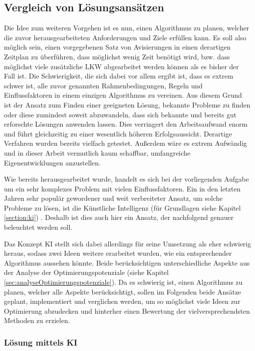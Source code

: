 \subsection{Vergleich von Lösungsansätzen}

Die Idee zum weiteren Vorgehen ist es nun, einen Algorithmus zu planen, welcher die zuvor herausgearbeiteten Anforderungen und Ziele erfüllen kann. Es soll also möglich sein, einen vorgegebenen Satz von Avisierungen in einen derartigen Zeitplan zu überführen, dass möglichst wenig Zeit benötigt wird, bzw. dass möglichst viele zusätzliche LKW abgearbeitet werden können als es bisher der Fall ist. Die Schwierigkeit, die sich dabei vor allem ergibt ist, dass es extrem schwer ist, alle zuvor genannten Rahmenbedingungen, Regeln und Einflussfaktoren in einem einzigen Algorithmus zu vereinen. Aus diesem Grund ist der Ansatz zum Finden einer geeigneten Lösung, bekannte Probleme zu finden oder diese zumindest soweit abzuwandeln, dass sich bekannte und bereits gut erforschte Lösungen anwenden lassen. Dies verringert den Arbeitsaufwand enorm und führt gleichzeitig zu einer wesentlich höheren Erfolgsaussicht. Derartige Verfahren wurden bereits vielfach getestet. Außerdem wäre es extrem Aufwändig und in dieser Arbeit vermutlich kaum schaffbar, umfangreiche Eigenentwicklungen anzustellen.

Wie bereits herausgearbeitet wurde, handelt es sich bei der vorliegenden Aufgabe um ein sehr komplexes Problem mit vielen Einflussfaktoren. Ein in den letzten Jahren sehr populär gewordener und weit verbreiteter Ansatz, um solche Probleme zu lösen, ist die Künstliche Intelligenz (für Grundlagen siehe Kapitel \ref{section:ki}) \cite{KIverstehen}. Deshalb ist dies auch hier ein Ansatz, der nachfolgend genauer beleuchtet werden soll. 

Das Konzept KI stellt sich dabei allerdings für seine Umsetzung als eher schwierig heraus, sodass zwei Ideen weitere erarbeitet wurden, wie ein entsprechender Algorithmus aussehen könnte. Beide berücksichtigen unterschiedliche Aspekte aus der Analyse der Optimierungspotenziale (siehe Kapitel \ref{sec:analyseOptimierungspotenziale}). Da es schwierig ist, einen Algorithmus zu planen, welcher alle Aspekte berücksichtigt, sollen im Folgenden beide Ansätze geplant, implementiert und verglichen werden, um so möglichst viele Ideen zur Optimierung abzudecken und hinterher einen Bewertung der vielversprechendsten Methoden zu erzielen.

\subsubsection{Lösung mittels KI}

